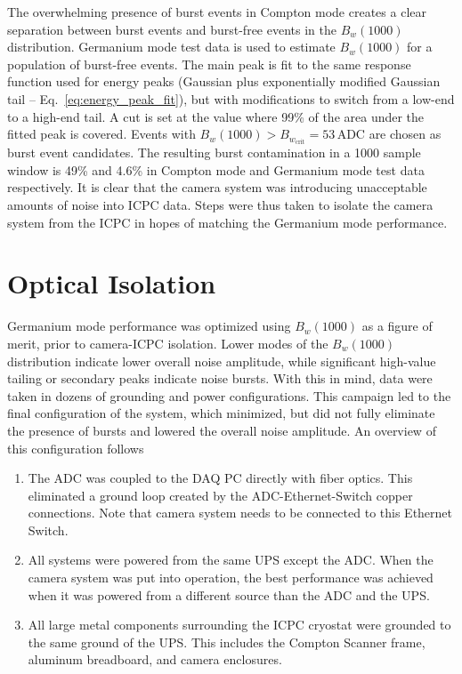 The overwhelming presence of burst events in Compton mode creates a clear separation between burst events and burst-free events in the $B_w(1000)$ distribution. Germanium mode test data is used to estimate $B_w(1000)$ for a population of burst-free events.  The main peak is fit to the same response function used for energy peaks (Gaussian plus exponentially modified Gaussian tail -- Eq.~\ref{eq:energy_peak_fit}), but with modifications to switch from a low-end to a high-end tail. A cut is set at the value where 99\% of the area under the fitted peak is covered. Events with $B_w(1000) > B_{w_\text{crit}}  = 53$\,ADC are chosen as burst event candidates. The resulting burst contamination in a 1000 sample window is 49\% and 4.6\% in Compton mode and Germanium mode test data respectively. It is clear that the camera system was introducing unacceptable amounts of noise into ICPC data. Steps were thus taken to isolate the camera system from the ICPC in hopes of matching the Germanium mode performance.

\section{Optical Isolation}
Germanium mode performance was optimized using $B_w(1000)$ as a figure of merit, prior to camera-ICPC isolation. Lower modes of the $B_w(1000)$ distribution indicate lower overall noise amplitude, while significant high-value tailing or secondary peaks indicate noise bursts. With this in mind, data were taken in dozens of grounding and power configurations. This campaign led to the final configuration of the system, which minimized, but did not fully eliminate the presence of bursts and lowered the overall noise amplitude. An overview of this configuration follows
\begin{enumerate}
	\item The ADC was coupled to the DAQ PC directly with fiber optics. This eliminated a ground loop created by the ADC-Ethernet-Switch copper connections. Note that camera system needs to be connected to this Ethernet Switch. 
	\item All systems were powered from the same UPS except the ADC. When the camera system was put into operation, the best performance was achieved when it was powered from a different source than the ADC and the UPS. 
	\item All large metal components surrounding the ICPC cryostat were grounded to the same ground of the UPS. This includes the Compton Scanner frame, aluminum breadboard, and camera enclosures.  
\end{enumerate} 


